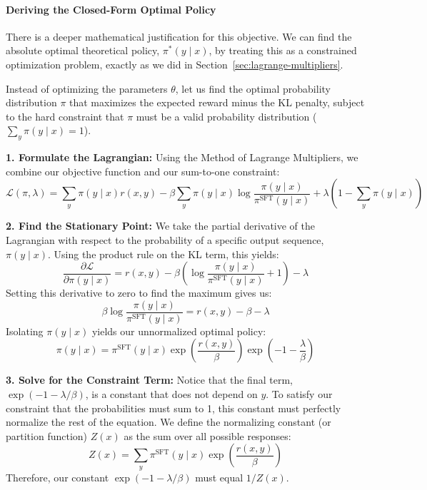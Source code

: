 \documentclass{book}
\begin{document}
\paragraph{Deriving the Closed-Form Optimal Policy}

There is a deeper mathematical justification for this objective. We can find the absolute optimal theoretical policy, $\pi^*(y \mid x)$, by treating this as a constrained optimization problem, exactly as we did in Section~\ref{sec:lagrange-multipliers}. 

Instead of optimizing the parameters $\theta$, let us find the optimal probability distribution $\pi$ that maximizes the expected reward minus the KL penalty, subject to the hard constraint that $\pi$ must be a valid probability distribution ($\sum_y \pi(y \mid x) = 1$).

\textbf{1. Formulate the Lagrangian:}
Using the Method of Lagrange Multipliers, we combine our objective function and our sum-to-one constraint:
\begin{equation}
\mathcal{L}(\pi, \lambda) = \sum_y \pi(y \mid x) r(x, y) - \beta \sum_y \pi(y \mid x) \log \frac{\pi(y \mid x)}{\pi^{\text{SFT}}(y \mid x)} + \lambda \left( 1 - \sum_y \pi(y \mid x) \right)
\end{equation}

\textbf{2. Find the Stationary Point:}
We take the partial derivative of the Lagrangian with respect to the probability of a specific output sequence, $\pi(y \mid x)$. Using the product rule on the KL term, this yields:
\begin{equation}
\frac{\partial \mathcal{L}}{\partial \pi(y \mid x)} = r(x,y) - \beta \left( \log \frac{\pi(y \mid x)}{\pi^{\text{SFT}}(y \mid x)} + 1 \right) - \lambda
\end{equation}
Setting this derivative to zero to find the maximum gives us:
\begin{equation}
\beta \log \frac{\pi(y \mid x)}{\pi^{\text{SFT}}(y \mid x)} = r(x,y) - \beta - \lambda
\end{equation}
Isolating $\pi(y \mid x)$ yields our unnormalized optimal policy:
\begin{equation}
\label{eq:unnormalized_optimal}
\pi(y \mid x) = \pi^{\text{SFT}}(y \mid x) \exp\left( \frac{r(x,y)}{\beta} \right) \exp\left( -1 - \frac{\lambda}{\beta} \right)
\end{equation}

\textbf{3. Solve for the Constraint Term:}
Notice that the final term, $\exp(-1 - \lambda/\beta)$, is a constant that does not depend on $y$. To satisfy our constraint that the probabilities must sum to 1, this constant must perfectly normalize the rest of the equation. We define the normalizing constant (or partition function) $Z(x)$ as the sum over all possible responses:
\begin{equation}
Z(x) = \sum_y \pi^{\text{SFT}}(y \mid x) \exp\left(\frac{r(x,y)}{\beta}\right)
\end{equation}
Therefore, our constant $\exp(-1 - \lambda/\beta)$ must equal $1/Z(x)$. 
\end{document}
